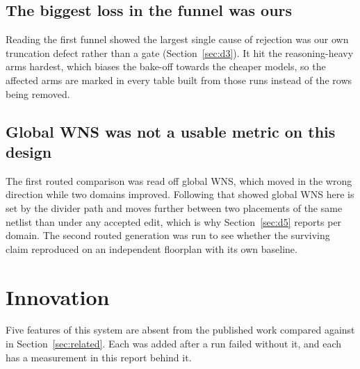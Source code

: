 \documentclass[11pt,a4paper]{article}
\begin{document}
\subsection{The biggest loss in the funnel was ours}

Reading the first funnel showed the largest single cause of rejection was our
own truncation defect rather than a gate (Section~\ref{sec:d3}). It hit the
reasoning-heavy arms hardest, which biases the bake-off towards the cheaper
models, so the affected arms are marked in every table built from those runs
instead of the rows being removed.

\subsection{Global WNS was not a usable metric on this design}

The first routed comparison was read off global WNS, which moved in the wrong
direction while two domains improved. Following that showed global WNS here is
set by the divider path and moves further between two placements of the same
netlist than under any accepted edit, which is why Section~\ref{sec:d5} reports
per domain. The second routed generation was run to see whether the surviving
claim reproduced on an independent floorplan with its own baseline.

\section{Innovation}
\label{sec:innovation}

Five features of this system are absent from the published work compared
against in Section~\ref{sec:related}. Each was added after a run failed without
it, and each has a measurement in this report behind it.
\end{document}
